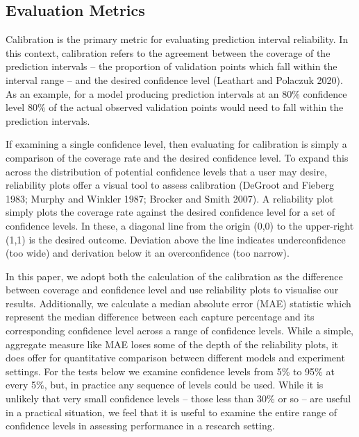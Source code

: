 \documentclass[colTwo]{format}
\theoremstyle{definition}
\begin{document}
\subsection{Evaluation Metrics}

Calibration is the primary metric for evaluating prediction interval reliability.  In this context, calibration refers to the agreement between the coverage of the prediction intervals -- the proportion of validation points which fall within the interval range -- and the desired confidence level (Leathart and Polaczuk 2020).  As an example, for a model producing prediction intervals at an 80\% confidence level 80\% of the actual observed validation points would need to fall within the prediction intervals.  

If examining a single confidence level, then evaluating for calibration is simply a comparison of the coverage rate and the desired confidence level.  To expand this across the distribution of potential confidence levels that a user may desire, reliability plots offer a visual tool to assess calibration (DeGroot and Fieberg 1983; Murphy and Winkler 1987; Brocker and Smith 2007).  A reliability plot simply plots the coverage rate against the desired confidence level for a set of confidence levels. In these, a diagonal line from the origin (0,0) to the upper-right (1,1) is the desired outcome.  Deviation above the line indicates underconfidence (too wide) and derivation below it an overconfidence (too narrow).  

In this paper, we adopt both the calculation of the calibration as the difference between coverage and confidence level and use reliability plots to visualise our results. Additionally, we calculate a median absolute error (MAE) statistic which represent the median difference between each capture percentage and its corresponding confidence level across a range of confidence levels.  While a simple, aggregate measure like MAE loses some of the depth of the reliability plots, it does offer for quantitative comparison between different models and experiment settings.  For the tests below we examine confidence levels from 5\% to 95\% at every 5\%, but, in practice any sequence of levels could be used.  While it is unlikely that very small confidence levels -- those less than 30\% or so -- are useful in a practical situation, we feel that it is useful to examine the entire range of confidence levels in assessing performance in a research setting. 
\end{document}

